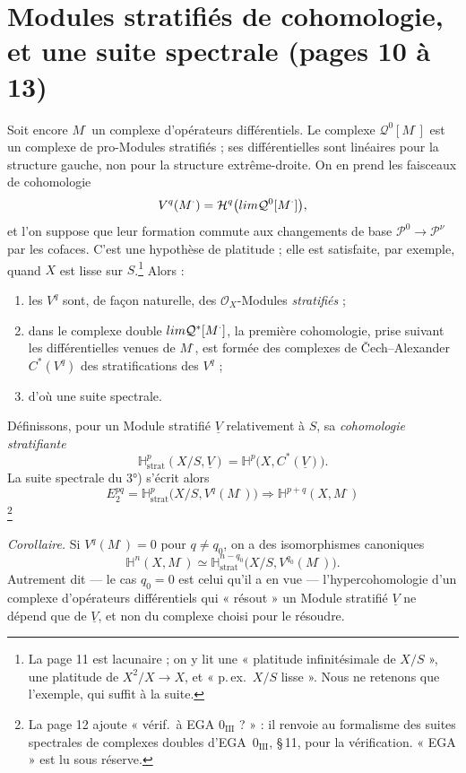 \documentclass[11pt,a4paper]{article}
\begin{document}
\section*{Modules stratifiés de cohomologie, et une suite spectrale (pages 10 à 13)}

Soit encore $M^{\cdot}$ un complexe d'opérateurs différentiels. Le complexe
$\mathcal{Q}^{0}[M^{\cdot}]$ est un complexe de pro-Modules stratifiés ; ses
différentielles sont linéaires pour la structure gauche, non pour la
structure extrême-droite. On en prend les faisceaux de cohomologie
\[
  V^{q}(M^{\cdot}) =
  \mathcal{H}^{q}\bigl(\varprojlim \mathcal{Q}^{0}[M^{\cdot}]\bigr) ,
\]
et l'on suppose que leur formation commute aux changements de base
$\mathcal{P}^{0} \to \mathcal{P}^{\nu}$ par les cofaces. C'est une hypothèse
de platitude ; elle est satisfaite, par exemple, quand $X$ est lisse sur
$S$.\footnote{La page 11 est lacunaire ; on y lit une « platitude
infinitésimale de $X/S$ », une platitude de $X^{2}/X \to X$, et « p.\,ex.\
$X/S$ lisse ». Nous ne retenons que l'exemple, qui suffit à la suite.}
Alors :

\begin{enumerate}
\item[1°)] les $V^{q}$ sont, de façon naturelle, des $\mathcal{O}_X$-Modules
  \emph{stratifiés} ;
\item[2°)] dans le complexe double $\varprojlim \mathcal{Q}^{*}[M^{\cdot}]$,
  la première cohomologie, prise suivant les différentielles venues de
  $M^{\cdot}$, est formée des complexes de Čech--Alexander $C^{*}(V^{q})$ des
  stratifications des $V^{q}$ ;
\item[3°)] d'où une suite spectrale.
\end{enumerate}

Définissons, pour un Module stratifié $\underline{V}$ relativement à $S$, sa
\emph{cohomologie stratifiante}
\[
  \mathbb{H}^{p}_{\mathrm{strat}}(X/S, \underline{V}) =
  \mathbb{H}^{p}\bigl(X, C^{*}(\underline{V})\bigr) .
\]
La suite spectrale du 3°) s'écrit alors
\[
  \boxed{\;
  E_{2}^{pq} = \mathbb{H}^{p}_{\mathrm{strat}}\bigl(X/S, V^{q}(M^{\cdot})\bigr)
  \Longrightarrow \mathbb{H}^{p+q}(X, M^{\cdot})
  \;}
\]
\footnote{La page 12 ajoute « vérif.\ à EGA $0_{\mathrm{III}}$ ? » : il
renvoie au formalisme des suites spectrales de complexes doubles d'EGA~0$_{\mathrm{III}}$,
§\,11, pour la vérification. « EGA » est lu sous réserve.}

\emph{Corollaire.} Si $V^{q}(M^{\cdot}) = 0$ pour $q \neq q_0$, on a des
isomorphismes canoniques
\[
  \mathbb{H}^{n}(X, M^{\cdot}) \simeq
  \mathbb{H}^{n-q_0}_{\mathrm{strat}}\bigl(X/S, V^{q_0}(M^{\cdot})\bigr) .
\]
Autrement dit — le cas $q_0 = 0$ est celui qu'il a en vue —
l'hypercohomologie d'un complexe d'opérateurs différentiels qui « résout »
un Module stratifié $\underline{V}$ ne dépend que de $\underline{V}$, et non
du complexe choisi pour le résoudre.
\end{document}
